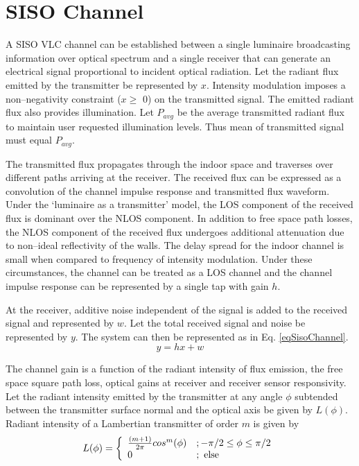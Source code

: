 \section{SISO Channel}
\label{sec:sisoChannel}
\graphicspath{{_SISO/Figures/}}

A SISO VLC channel can be established between a single luminaire broadcasting information over optical spectrum  and a single receiver that can generate an electrical signal proportional to incident optical radiation. Let the radiant flux emitted by the transmitter be represented by $x$. Intensity modulation imposes a non--negativity constraint ($x\geq$ 0) on the transmitted signal. The emitted radiant flux also provides illumination. Let $P_{avg}$ be the average transmitted radiant flux to maintain user requested illumination levels. Thus mean of transmitted signal must equal $P_{avg}$.

The transmitted flux propagates through the indoor space and traverses over different paths arriving at the receiver. The received flux can be expressed as a convolution of the channel impulse response and transmitted flux waveform. Under the `luminaire as a transmitter' model, the LOS component of the received flux is dominant over the NLOS component. In addition to free space path losses, the NLOS component of the received flux undergoes additional attenuation due to non--ideal reflectivity of the walls. The delay spread for the indoor channel is small when compared to frequency of intensity modulation. Under these circumstances, the channel can be treated as a LOS channel and the channel impulse response can be represented by a single tap with gain $h$. 

At the receiver, additive noise independent of the signal is added to the received signal and represented by $w$. Let the total received signal and noise be represented by $y$. The system can then be represented as in Eq. \eqref{eqSisoChannel}.
\begin{equation}
	\label{eqSisoChannel}
	y = hx + w
\end{equation}

The channel gain is a function of the radiant intensity of flux emission, the free space square path loss, optical gains at receiver and receiver sensor responsivity. Let the radiant intensity emitted by the transmitter at any angle $\phi$ subtended between the transmitter surface normal and the optical axis be given by $L(\phi)$. Radiant intensity of a Lambertian transmitter of order $m$ is given by
\begin{equation}
	\label{eqLambertian}
	L(\phi) = \left\{ \begin{array}{ll} {\frac{(m+1)}{2\pi}}cos^{m}(\phi) &; -\pi/2\leq\phi\leq\pi/2 \\ 0 &; \mbox{ else} \end{array} \right.
\end{equation}

